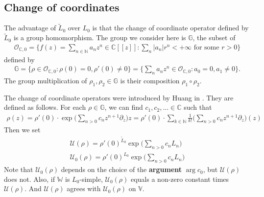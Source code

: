 \documentclass[11pt,b5paper,notitlepage]{article}
\theoremstyle{definition}
\theoremstyle{plain}
\newcommand{\mc}{\mathcal}
\newcommand{\wtd}{\widetilde}
\newcommand{\scr}{\mathscr}
\newcommand{\Vbb}{\mathbb V}
\newcommand{\Wbb}{\mathbb W}
\newcommand{\Gbb}{\mathbb G}
\newcommand{\Cbb}{\mathbb C}
\newcommand{\Nbb}{\mathbb N}
\numberwithin{equation}{section}
\begin{document}
\subsection{Change of coordinates}\label{lb86}


The advantage of $\wtd L_0$ over $L_0$ is that the change of coordinate operator defined by $\wtd L_0$ is a group homomorphism. The group we consider here is $\Gbb$, the subset of
\begin{align*}
\scr O_{\Cbb,0}=\Big\{f(z)=\sum_{n\in\Nbb}a_nz^n\in\Cbb[[z]]:\sum_n |a_n|r^n<+\infty\text{ for some }r>0\Big\}
\end{align*}
defined by \index{G@$\Gbb$}
\begin{align*}
\Gbb=\{\rho\in\scr O_{\Cbb,0}:\rho(0)=0,\rho'(0)\neq0\}=\Big\{\sum_n a_nz^n\in\scr O_{\Cbb,0}: a_0=0,a_1\neq 0 \Big\}.
\end{align*}
The group multiplication of $\rho_1,\rho_2\in\Gbb$ is their composition $\rho_1\circ\rho_2$.



The change of coordinate operators were introduced by Huang in \cite{Hua97}. They are defined as follows. For each $\rho\in\Gbb$, we can find $c_1,c_2,\dots\in\Cbb$  such that
\begin{align*}
\rho(z)=\rho'(0)\cdot \exp\Big(\sum_{n>0}c_nz^{n+1}\partial_z \Big)z=\rho'(0)\cdot\sum_{k\in\Nbb} \frac 1{k!}\Big(\sum_{n>0}c_nz^{n+1}\partial_z \Big)(z)
\end{align*}
Then we set \index{U@$\mc U(\rho),\mc U_0(\rho)$}
\begin{subequations}\label{eq94}
\begin{gather}
\mc U(\rho)=\rho'(0)^{\wtd L_0}\exp\Big(\sum_{n>0}c_n L_n\Big)\\
\mc U_0(\rho)=\rho'(0)^{L_0}\exp\Big(\sum_{n>0}c_n L_n\Big)
\end{gather}
\end{subequations}
Note that $\mc U_0(\rho)$ depends on the choice of the \textbf{argument} $\arg c_0$, but $\mc U(\rho)$ does not. Also, if $\Wbb$ is $L_0$-simple, $\mc U_0(\rho)$ equals a non-zero constant times $\mc U(\rho)$. And $\mc U(\rho)$ agrees with $\mc U_0(\rho)$ on $\Vbb$.
\end{document}
